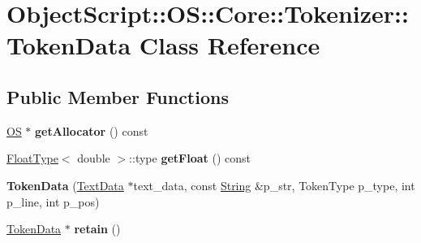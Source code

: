 \hypertarget{class_object_script_1_1_o_s_1_1_core_1_1_tokenizer_1_1_token_data}{}\section{Object\+Script\+:\+:OS\+:\+:Core\+:\+:Tokenizer\+:\+:Token\+Data Class Reference}
\label{class_object_script_1_1_o_s_1_1_core_1_1_tokenizer_1_1_token_data}
\subsection*{Public Member Functions}
\begin{DoxyCompactItemize}
\item 
\hyperlink{class_object_script_1_1_o_s}{OS} $\ast$ {\bfseries get\+Allocator} () const \hypertarget{class_object_script_1_1_o_s_1_1_core_1_1_tokenizer_1_1_token_data_a80c8c10d6ad050aa6241c97406a3cf93}{}\label{class_object_script_1_1_o_s_1_1_core_1_1_tokenizer_1_1_token_data_a80c8c10d6ad050aa6241c97406a3cf93}

\item 
\hyperlink{struct_object_script_1_1_float_type}{Float\+Type}$<$ double $>$\+::type {\bfseries get\+Float} () const \hypertarget{class_object_script_1_1_o_s_1_1_core_1_1_tokenizer_1_1_token_data_a7bfdc523ba48e885141c0045a0e7f985}{}\label{class_object_script_1_1_o_s_1_1_core_1_1_tokenizer_1_1_token_data_a7bfdc523ba48e885141c0045a0e7f985}

\item 
{\bfseries Token\+Data} (\hyperlink{class_object_script_1_1_o_s_1_1_core_1_1_tokenizer_1_1_text_data}{Text\+Data} $\ast$text\+\_\+data, const \hyperlink{class_object_script_1_1_o_s_1_1_core_1_1_string}{String} \&p\+\_\+str, Token\+Type p\+\_\+type, int p\+\_\+line, int p\+\_\+pos)\hypertarget{class_object_script_1_1_o_s_1_1_core_1_1_tokenizer_1_1_token_data_ac3d2617c3f7eec44c5353e228d76f1e0}{}\label{class_object_script_1_1_o_s_1_1_core_1_1_tokenizer_1_1_token_data_ac3d2617c3f7eec44c5353e228d76f1e0}

\item 
\hyperlink{class_object_script_1_1_o_s_1_1_core_1_1_tokenizer_1_1_token_data}{Token\+Data} $\ast$ {\bfseries retain} ()\hypertarget{class_object_script_1_1_o_s_1_1_core_1_1_tokenizer_1_1_token_data_a263211b763c290a14cf54f5db17bdd13}{}\label{class_object_script_1_1_o_s_1_1_core_1_1_tokenizer_1_1_token_data_a263211b763c290a14cf54f5db17bdd13}


\end{DoxyCompactItemize}
